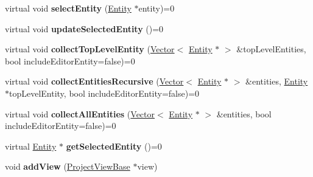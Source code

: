 \begin{DoxyCompactItemize}
\item 
virtual void {\bfseries select\+Entity} (\hyperlink{class_i_dream_sky_1_1_entity}{Entity} $\ast$entity)=0\hypertarget{class_i_dream_sky_1_1_project_model_base_a0ac3f7b23a7ea426c39cbbf7794cc8f3}{}\label{class_i_dream_sky_1_1_project_model_base_a0ac3f7b23a7ea426c39cbbf7794cc8f3}

\item 
virtual void {\bfseries update\+Selected\+Entity} ()=0\hypertarget{class_i_dream_sky_1_1_project_model_base_ac8e2925ae84e3cde308804ca9035d0db}{}\label{class_i_dream_sky_1_1_project_model_base_ac8e2925ae84e3cde308804ca9035d0db}

\item 
virtual void {\bfseries collect\+Top\+Level\+Entity} (\hyperlink{class_i_dream_sky_1_1_vector}{Vector}$<$ \hyperlink{class_i_dream_sky_1_1_entity}{Entity} $\ast$ $>$ \&top\+Level\+Entities, bool include\+Editor\+Entity=false)=0\hypertarget{class_i_dream_sky_1_1_project_model_base_ab41bfff69c0c88abf969a3f8a95f6fc8}{}\label{class_i_dream_sky_1_1_project_model_base_ab41bfff69c0c88abf969a3f8a95f6fc8}

\item 
virtual void {\bfseries collect\+Entities\+Recursive} (\hyperlink{class_i_dream_sky_1_1_vector}{Vector}$<$ \hyperlink{class_i_dream_sky_1_1_entity}{Entity} $\ast$ $>$ \&entities, \hyperlink{class_i_dream_sky_1_1_entity}{Entity} $\ast$top\+Level\+Entity, bool include\+Editor\+Entity=false)=0\hypertarget{class_i_dream_sky_1_1_project_model_base_acddf0ccbbb731b213a8780d43833fb4f}{}\label{class_i_dream_sky_1_1_project_model_base_acddf0ccbbb731b213a8780d43833fb4f}

\item 
virtual void {\bfseries collect\+All\+Entities} (\hyperlink{class_i_dream_sky_1_1_vector}{Vector}$<$ \hyperlink{class_i_dream_sky_1_1_entity}{Entity} $\ast$ $>$ \&entities, bool include\+Editor\+Entity=false)=0\hypertarget{class_i_dream_sky_1_1_project_model_base_a7c82dcc4174e79e3e91cb71cf8176e8e}{}\label{class_i_dream_sky_1_1_project_model_base_a7c82dcc4174e79e3e91cb71cf8176e8e}

\item 
virtual \hyperlink{class_i_dream_sky_1_1_entity}{Entity} $\ast$ {\bfseries get\+Selected\+Entity} ()=0\hypertarget{class_i_dream_sky_1_1_project_model_base_a6b00b017f938391ed94d79ca999a8442}{}\label{class_i_dream_sky_1_1_project_model_base_a6b00b017f938391ed94d79ca999a8442}

\item 
void {\bfseries add\+View} (\hyperlink{class_i_dream_sky_1_1_project_view_base}{Project\+View\+Base} $\ast$view)\hypertarget{class_i_dream_sky_1_1_project_model_base_a7cfdf95dd9a22bc41132c411ebccee72}{}\label{class_i_dream_sky_1_1_project_model_base_a7cfdf95dd9a22bc41132c411ebccee72}


\end{DoxyCompactItemize}
